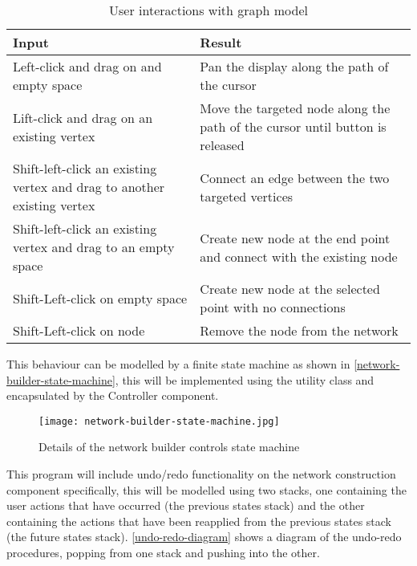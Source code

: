     \begin{table}
        \centering
        \begin{tabular}{|p{}|p{}|}
            \hline
            \textbf{Input} & \textbf{Result}\\
            \hline
            Left-click and drag on and empty space & Pan the display along the path of the cursor\\\hline

            Lift-click and drag on an existing vertex & Move the targeted node along the path of the cursor until button is released\\\hline

            Shift-left-click an existing vertex and drag to another existing vertex & Connect an edge between the two targeted vertices\\\hline

            Shift-left-click an existing vertex and drag to an empty space & Create new node at the end point and connect with the existing node\\\hline

            Shift-Left-click on empty space & Create new node at the selected point with no connections\\\hline

            Shift-Left-click on node & Remove the node from the network\\\hline
        \end{tabular}
        \caption{User interactions with graph model}
        \label{user-interaction-specification}
    \end{table}

    This behaviour can be modelled by a finite state machine as shown in \autoref{network-builder-state-machine}, this will be implemented using the  utility class and encapsulated by the Controller component.

    \begin{figure}
        \centering
        \texttt{[image: network-builder-state-machine.jpg]}
        \caption{Details of the network builder controls state machine}
        \label{network-builder-state-machine}
    \end{figure}

    This program will include undo/redo functionality on the network construction component specifically, this will be modelled using two stacks, one containing the user actions that have occurred (the previous states stack) and the other containing the actions that have been reapplied from the previous states stack (the future states stack). \autoref{undo-redo-diagram} shows a diagram of the undo-redo procedures, popping from one stack and pushing into the other.

